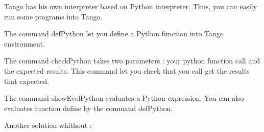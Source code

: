 Tango has his own interpreter based on Python interpreter.
Thus, you can easily run some programs into Tango.

The command defPython let you define a Python function into Tango environment.



The command checkPython takes two parameters : your python function call and the expected results. This command let you check that you call get the results that expected.




The command showEvelPython evaluates a Python expression.
You can also evaluates function define by the command defPython.

\answer[lines=9, points=2]{
\showDefPython[construire]
}


Another solution whithout  :


